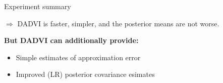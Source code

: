 \documentclass[8pt]{beamer}\usepackage[]{graphicx}\usepackage[]{color}
\begin{document}







\begin{frame}{Experiment summary}

$\Rightarrow$ DADVI is faster, simpler, and the posterior means are not worse.

\textbf{But DADVI can additionally provide:}
%
\begin{itemize}
\item Simple estimates of approximation error
\item Improved (LR) posterior covariance esimates \citep{giordano:2015:lrvb}
\end{itemize}
\vspace{3em}
%
\begin{center}
\begin{minipage}{0.5\textwidth}
\end{minipage}
\end{center}

\end{frame}
\end{document}
